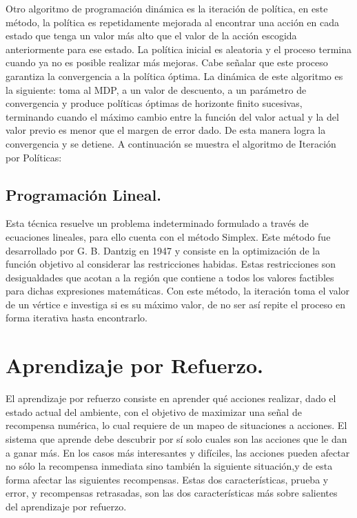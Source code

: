 Otro algoritmo de programación dinámica es la iteración de política, en este método, la política es repetidamente mejorada al encontrar una acción en cada estado que tenga un valor más alto que el valor de la acción escogida anteriormente para ese estado. La política inicial es aleatoria y el proceso termina cuando ya no es posible realizar más mejoras. Cabe señalar que este proceso garantiza la convergencia a la política óptima.
La dinámica de este algoritmo es la siguiente: toma al MDP, a un valor de descuento, a un parámetro de convergencia y produce políticas óptimas de horizonte finito sucesivas, terminando cuando el máximo cambio entre la función del valor actual y la del valor previo es menor que el margen de error dado. De esta manera logra la convergencia y se detiene. A continuación se muestra el algoritmo de Iteración por Políticas:

\subsection{Programación Lineal.}

Esta técnica resuelve un problema indeterminado formulado a través de ecuaciones lineales, para ello cuenta con el método Simplex. Este método fue desarrollado por G. B. Dantzig en 1947 y consiste en la optimización de la función objetivo al considerar las restricciones habidas. Estas restricciones son desigualdades que acotan a la región que contiene a todos los valores factibles para dichas expresiones matemáticas. Con este método, la iteración toma el valor de un vértice e investiga si es su máximo valor, de no ser así repite el proceso en forma iterativa hasta encontrarlo.

\section{Aprendizaje por Refuerzo.}
El aprendizaje por refuerzo consiste en aprender qué acciones realizar, dado el estado actual del ambiente, con el objetivo de maximizar una se\~{n}al de recompensa numérica, lo cual requiere de un mapeo de situaciones a acciones. El sistema que aprende debe descubrir por sí solo cuales son las acciones que le dan a ganar más. En los casos más interesantes y difíciles, las acciones pueden afectar no sólo la recompensa inmediata sino también la siguiente situación,y de esta forma afectar las siguientes recompensas. Estas dos características, prueba y error, y recompensas retrasadas, son las dos características más sobre salientes del aprendizaje por refuerzo.\\

